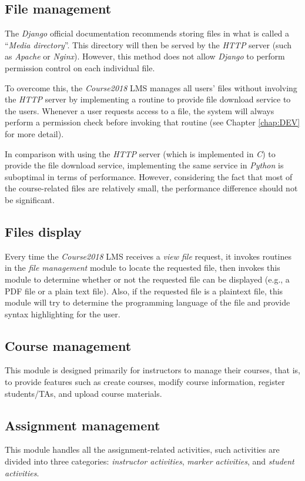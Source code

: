 \subsection{File management}
The \emph{Django} official documentation recommends storing files in what is
called a ``\emph{Media directory}''. This directory will then be served by the
\emph{HTTP} server \cite{CdjangoManagingFiles}
(such as \emph{Apache} or \emph{Nginx}). However, this method does not allow
\emph{Django} to perform permission control on each individual file.

\medskip

To overcome this, the \emph{Course2018} LMS manages all users' files without
involving the \emph{HTTP} server by implementing a routine to provide file
download service to the users. Whenever a user requests access to a file, the system
will always perform a permission check before invoking that routine
(see Chapter \ref{chap:DEV} for more detail).

\medskip

In comparison with
using the \emph{HTTP} server (which is implemented in \emph{C}) to provide
the file download service,
implementing the same service in \emph{Python} is suboptimal in terms of
performance.
However, considering the fact that most of the course-related
files are relatively small, the performance difference should
not be significant.

\subsection{Files display}
Every time the \emph{Course2018} LMS receives a \emph{view file} request,
it invokes routines in the \emph{file management} module to locate the
requested file, then invokes this module to determine whether or not the
requested file can be displayed (e.g., a PDF file or a plain text file). Also,
if the requested file is a plaintext file, this module will try to determine
the programming language of the file and provide syntax highlighting for the
user.

\subsection{Course management}
This module is designed primarily for instructors to manage their courses, 
that is, to provide features such as create courses, modify course information,
register students/TAs, and upload course materials.

\subsection{Assignment management}
\label{sec:ASNMAN}
This module handles all the assignment-related activities, such activities are
divided into three categories: \emph{instructor activities}, 
\emph{marker activities}, and \emph{student activities}.

